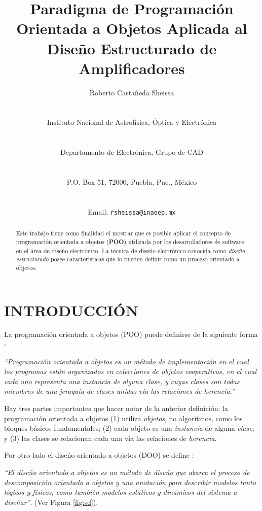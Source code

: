 \documentclass[10pt,twocolumn,twoside,letterpaper]{IEEEtran}
\title{Paradigma de Programaci\'on Orientada a Objetos Aplicada al Dise\~no Estructurado de Amplificadores}
\author{\begin{Large}{Roberto Casta\~neda Sheissa}\end{Large}\\ \begin{Large}Instituto Nacional de Astrof\'isica, \'Optica y Electr\'onica\end{Large}\\ \begin {Large} Departamento de Electr\'onica, Grupo de CAD\end{Large}\\ \begin{Large}P.O. Box 51, 72000, Puebla, Pue., M\'exico\end{Large}\\ \begin{Large}Email: {\tt rsheissa@inaoep.mx}\end{Large}}
\begin{document}
\pagestyle{empty}
\maketitle

\thispagestyle{empty}
\begin{abstract}
Este trabajo tiene como finalidad el mostrar que es posible aplicar el concepto de programaci\'on orientada a objetos ({\bf POO}) utilizada por los desarrolladores de software en el \'area de dise\~no electr\'onico. La t\'ecnica de dise\~no electr\'onico conocida como {\it dise\~no estructurado} posee caracter\'isticas que lo pueden definir como un proceso orientado a objetos. 
\end{abstract}

{\section{\bf {INTRODUCCI\'ON}}
La programaci\'on orientada a objetos (POO) puede definirse de la siguiente forma \cite{booch}:
\begin{description}
\item{\it ``Programaci\'on orientada a objetos es un m\'etodo de implementaci\'on en el cual los programas est\'an organizados en colecciones de objetos cooperativos, en el cual cada uno representa una instancia de alguna clase, y cuyas clases son todas miembros de una jeraqu\'ia de clases unidas v\'ia las relaciones de herencia.''}
 \end{description}

Hay tres partes importantes que hacer notar de la anterior definici\'on: la programaci\'on o\-rien\-ta\-da a objetos (1) utiliza {\it objetos}, no algoritmos, como los bloques b\'asicos fundamentales; (2) \mbox{cada} objeto es una {\it instancia} de alguna {\it clase}; y (3) las clases se relacionan cada una v\'ia las relaciones de {\it herencia}.

Por otro lado el dise\~no orientado a objetos (DOO) se define \cite{booch}:
\begin{description}
\item {\it ``El dise\~no orientado a objetos es un m\'etodo de dise\~no que abarca el proceso de descomposici\'on orientado a objetos y una anotaci\'on para describir modelos tanto l\'ogicos y f\'isicos, como tambi\'en modelos est\'aticos y din\'amicos del sistema a dise\~nar''}. (Ver Figura \ref{fig:sd}).
\end{description}

}
\end{document}
